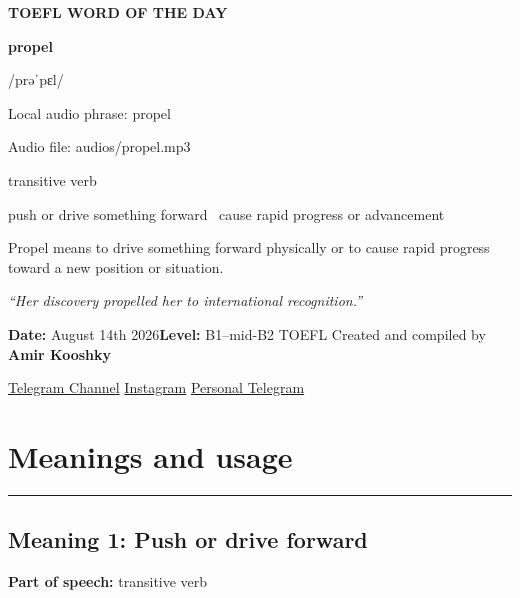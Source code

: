 \documentclass[11pt]{article}
\newcommand{\sectionrule}{\par\vspace{-0.5em}\noindent\textcolor{Accent}{\rule{\linewidth}{0.6pt}}\par}
\begin{document}
\begin{center}
{\sffamily\bfseries\color{Accent} TOEFL WORD OF THE DAY\par}
\vspace{8mm}
{\fontsize{42}{48}\selectfont\bfseries propel\par}
\vspace{2mm}
{\Large\sffamily\color{Accent} /prəˈpɛl/\par}
\vspace{2mm}
{\small\sffamily Local audio phrase: propel\par}
{\small\sffamily Audio file: audios/propel.mp3\par}
\vspace{2mm}
{\large\sffamily\color{Muted} transitive verb\par}
\vspace{5mm}
{\sffamily push or drive something forward \textbullet\ cause rapid progress or advancement\par}
\vspace{6mm}
{\large Propel means to drive something forward physically or to cause rapid progress toward a new position or situation.\par}
\vspace{6mm}
\begin{minipage}{0.84\textwidth}
\itshape “Her discovery propelled her to international recognition.”
\end{minipage}\par
\vspace{10mm}
\textbf{Date:} August 14th 2026\quad\textbullet\quad \textbf{Level:} B1--mid-B2 TOEFL
\vfill
Created and compiled by \textbf{Amir Kooshky}\par
\vspace{2mm}
\href{https://t.me/KooshkyTOEFL}{Telegram Channel}\quad\textbullet\quad
\href{https://www.instagram.com/kooshkytoefl}{Instagram}\quad\textbullet\quad
\href{https://t.me/KooshkyTOEFL\_pv}{Personal Telegram}
\end{center}
\newpage
\tableofcontents
\newpage

\section{Meanings and usage}
\sectionrule
\subsection{Meaning 1: Push or drive forward}
\textbf{Part of speech:} transitive verb
\end{document}
